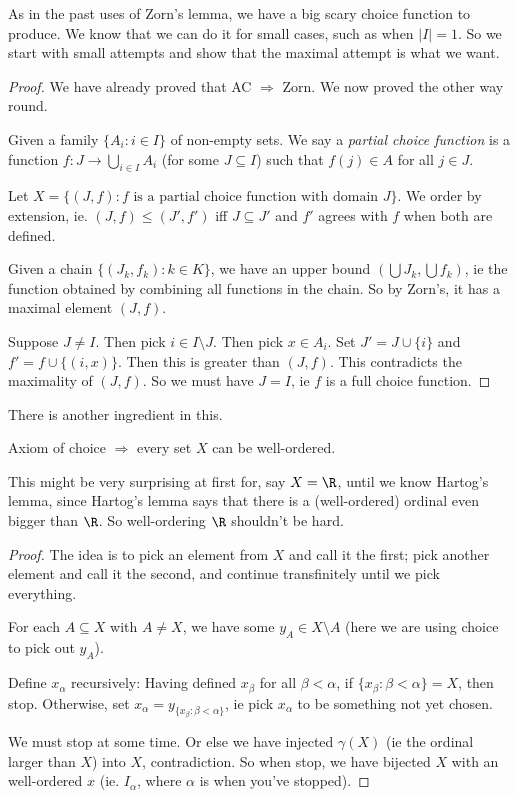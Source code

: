 \documentclass[a4paper]{article}
\begin{document}
As in the past uses of Zorn's lemma, we have a big scary choice function to produce. We know that we can do it for small cases, such as when $|I| = 1$. So we start with small attempts and show that the maximal attempt is what we want.
\begin{proof}
  We have already proved that AC $\Rightarrow $ Zorn. We now proved the other way round.

  Given a family $\{A_i: i\in I\}$ of non-empty sets. We say a \emph{partial choice function} is a function $f: J\to \bigcup_{i\in I}A_i$ (for some $J\subseteq I$) such that $f(j)\in A$ for all $j\in J$.

  Let $X = \{(J, f): f\text{ is a partial choice function with domain }J\}$. We order by extension, ie. $(J, f) \leq (J', f')$ iff $J\subseteq J'$ and $f'$ agrees with $f$ when both are defined.

  Given a chain $\{(J_k, f_k): k\in K\}$, we have an upper bound $\left(\bigcup J_k, \bigcup f_k\right)$, ie the function obtained by combining all functions in the chain. So by Zorn's, it has a maximal element $(J, f)$.

  Suppose $J \not = I$. Then pick $i\in I\setminus J$. Then pick $x\in A_i$. Set $J' = J\cup \{i\}$ and $f' = f\cup\{(i, x)\}$. Then this is greater than $(J, f)$. This contradicts the maximality of $(J, f)$. So we must have $J = I$, ie $f$ is a full choice function.
\end{proof}

There is another ingredient in this.
\begin{thm}
  Axiom of choice $\Rightarrow$ every set $X$ can be well-ordered.
\end{thm}
\note This might be very surprising at first for, say $X = \R$, until we know Hartog's lemma, since Hartog's lemma says that there is a (well-ordered) ordinal even bigger than $\R$. So well-ordering $\R$ shouldn't be hard.

\begin{proof}
  The idea is to pick an element from $X$ and call it the first; pick another element and call it the second, and continue transfinitely until we pick everything.

  For each $A\subseteq X$ with $A\not= X$, we have some $y_A\in X\setminus A$ (here we are using choice to pick out $y_A$).

  Define $x_\alpha$ recursively: Having defined $x_{\beta}$ for all $\beta < \alpha$, if $\{x_\beta: \beta < \alpha\} = X$, then stop. Otherwise, set $x_\alpha = y_{\{x_\beta: \beta< \alpha\}}$, ie pick $x_\alpha$ to be something not yet chosen.

  We must stop at some time. Or else we have injected $\gamma(X)$ (ie the ordinal larger than $X$) into $X$, contradiction. So when stop, we have bijected $X$ with an well-ordered $x$ (ie. $I_\alpha$, where $\alpha$ is when you've stopped).
\end{proof}
\end{document}
